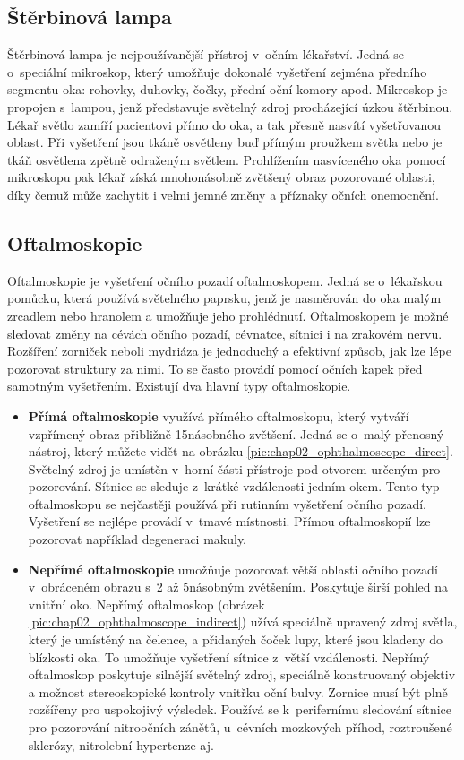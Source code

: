 \subsection*{Štěrbinová lampa}
Štěrbinová lampa je nejpoužívanější přístroj v~očním lékařství. Jedná se o~speciální mikroskop, který umožňuje dokonalé vyšetření zejména předního segmentu oka: rohovky, duhovky, čočky, přední oční komory apod. Mikroskop je propojen s~lampou, jenž představuje světelný zdroj procházející úzkou štěrbinou. Lékař světlo zamíří pacientovi přímo do oka, a tak přesně nasvítí vyšetřovanou oblast. Při vyšetření jsou tkáně osvětleny buď přímým proužkem světla nebo je tkáň osvětlena zpětně odraženým světlem. Prohlížením nasvíceného oka pomocí mikroskopu pak lékař získá mnohonásobně zvětšený obraz pozorované oblasti, díky čemuž může zachytit i velmi jemné změny a příznaky očních onemocnění.

\subsection*{Oftalmoskopie}
Oftalmoskopie je vyšetření očního pozadí oftalmoskopem. Jedná se o~lékařskou pomůcku, která používá světelného paprsku, jenž je nasměrován do oka malým zrcadlem nebo hranolem a umožňuje jeho prohlédnutí. Oftalmoskopem je možné sledovat změny na cévách očního pozadí, cévnatce, sítnici i na zrakovém nervu. Rozšíření zorniček neboli mydriáza je jednoduchý a efektivní způsob, jak lze lépe pozorovat struktury za nimi. To se často provádí pomocí očních kapek před samotným vyšetřením. Existují dva hlavní typy oftalmoskopie. 

\begin{itemize}
  \item\textbf{Přímá oftalmoskopie} využívá přímého oftalmoskopu, který vytváří vzpřímený obraz přibližně 15násobného zvětšení. Jedná se o~malý přenosný nástroj, který můžete vidět na obrázku \ref{pic:chap02_ophthalmoscope_direct}. Světelný zdroj je umístěn v~horní části přístroje pod otvorem určeným pro pozorování. Sítnice se sleduje z~krátké vzdálenosti jedním okem. Tento typ oftalmoskopu se nejčastěji používá při rutinním vyšetření očního pozadí. Vyšetření se nejlépe provádí v~tmavé místnosti. Přímou oftalmoskopií lze pozorovat například degeneraci makuly. 
  \item\textbf{Nepřímé oftalmoskopie} umožňuje pozorovat větší oblasti očního pozadí v~obráceném obrazu s~2 až 5násobným zvětšením. Poskytuje širší pohled na vnitřní oko. Nepřímý oftalmoskop (obrázek \ref{pic:chap02_ophthalmoscope_indirect}) užívá speciálně upravený zdroj světla, který je umístěný na čelence, a přidaných čoček lupy, které jsou kladeny do blízkosti oka. To umožňuje vyšetření sítnice z~větší vzdálenosti. Nepřímý oftalmoskop poskytuje silnější světelný zdroj, speciálně konstruovaný objektiv a možnost stereoskopické kontroly vnitřku oční bulvy. Zornice musí být plně rozšířeny pro uspokojivý výsledek. Používá se k~perifernímu sledování sítnice pro pozorování nitroočních zánětů, u~cévních mozkových příhod, roztroušené sklerózy, nitrolební hypertenze aj.
\end{itemize}

